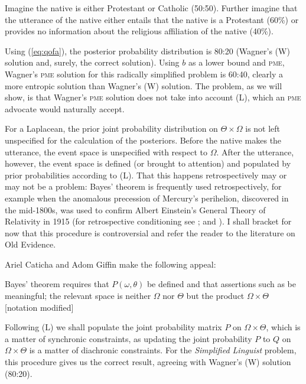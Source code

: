 \documentclass[phd,12pt,oneside]{ubcthesis}
\begin{document}
\begin{quotex}
  \label{ex:simpllinguist} Imagine the
  native is either Protestant or Catholic (50:50). Further imagine
  that the utterance of the native either entails that the native is a
  Protestant (60\%) or provides no information about the religious
  affiliation of the native (40\%).
\end{quotex}

Using (\ref{eq:qofa}), the posterior probability distribution is 80:20
(Wagner's (W) solution and, surely, the correct solution). Using $b$
as a lower bound and \textsc{pme}, Wagner's \textsc{pme} solution for this radically
simplified problem is 60:40, clearly a more entropic solution than
Wagner's (W) solution. The problem, as we will show, is that Wagner's
\textsc{pme} solution does not take into account (L), which an \textsc{pme} advocate
would naturally accept.

For a Laplacean, the prior joint probability distribution on
$\Theta\times\Omega$ is not left unspecified for the calculation of
the posteriors. Before the native makes the utterance, the event space
is unspecified with respect to $\Omega$. After the utterance, however,
the event space is defined (or brought to attention) and populated by
prior probabilities according to (L). That this happens
retrospectively may or may not be a problem: Bayes' theorem is
frequently used retrospectively, for example when the anomalous
precession of Mercury's perihelion, discovered in the mid-1800s, was
used to confirm Albert Einstein's General Theory of Relativity in 1915
(for retrospective conditioning see ; and
). I shall bracket for now that this
procedure is controversial and refer the reader to the literature on
Old Evidence.

Ariel Caticha and Adom Giffin make the following
appeal:

\begin{quotex}
  Bayes' theorem requires that $P(\omega,\theta)$ be defined and that
  assertions such as  be
  meaningful; the relevant space is neither $\Omega$ nor $\Theta$ but
  the product $\Omega\times\Theta$ [notation modified]
\end{quotex}

Following (L) we shall populate the joint probability matrix $P$ on
$\Omega\times\Theta$, which is a matter of synchronic constraints, as
updating the joint probability $P$ to $Q$ on $\Omega\times\Theta$ is a
matter of diachronic constraints. For the \emph{Simplified Linguist}
problem, this procedure gives us the correct result, agreeing with
Wagner's (W) solution (80:20).
\end{document}
